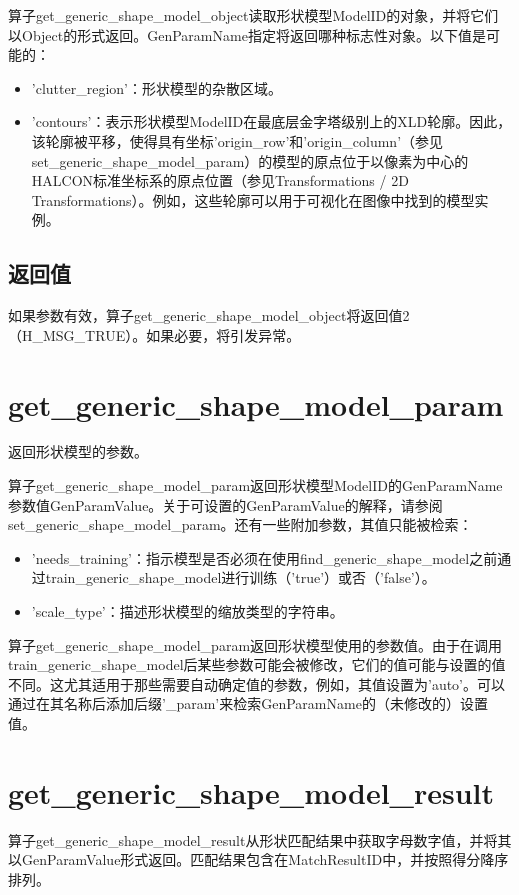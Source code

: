\documentclass{article}
\begin{document}
算子get\_generic\_shape\_model\_object读取形状模型ModelID的对象，并将它们以Object的形式返回。GenParamName指定将返回哪种标志性对象。以下值是可能的：

\begin{itemize}
	\item 'clutter\_region'：形状模型的杂散区域。
	\item 'contours'：表示形状模型ModelID在最底层金字塔级别上的XLD轮廓。因此，该轮廓被平移，使得具有坐标'origin\_row'和'origin\_column'（参见set\_generic\_shape\_model\_param）的模型的原点位于以像素为中心的HALCON标准坐标系的原点位置（参见Transformations / 2D Transformations）。例如，这些轮廓可以用于可视化在图像中找到的模型实例。
\end{itemize}

\subsection{返回值}
如果参数有效，算子get\_generic\_shape\_model\_object将返回值2（H\_MSG\_TRUE）。如果必要，将引发异常。

\section{get\_generic\_shape\_model\_param}
返回形状模型的参数。

算子get\_generic\_shape\_model\_param返回形状模型ModelID的GenParamName参数值GenParamValue。关于可设置的GenParamValue的解释，请参阅set\_generic\_shape\_model\_param。还有一些附加参数，其值只能被检索：
\begin{itemize}
	\item 'needs\_training'：指示模型是否必须在使用find\_generic\_shape\_model之前通过train\_generic\_shape\_model进行训练（'true'）或否（'false'）。
	\item 'scale\_type'：描述形状模型的缩放类型的字符串。
\end{itemize}

算子get\_generic\_shape\_model\_param返回形状模型使用的参数值。由于在调用train\_generic\_shape\_model后某些参数可能会被修改，它们的值可能与设置的值不同。这尤其适用于那些需要自动确定值的参数，例如，其值设置为'auto'。可以通过在其名称后添加后缀'\_param'来检索GenParamName的（未修改的）设置值。


\section{get\_generic\_shape\_model\_result}
算子get\_generic\_shape\_model\_result从形状匹配结果中获取字母数字值，并将其以GenParamValue形式返回。匹配结果包含在MatchResultID中，并按照得分降序排列。
\end{document}
